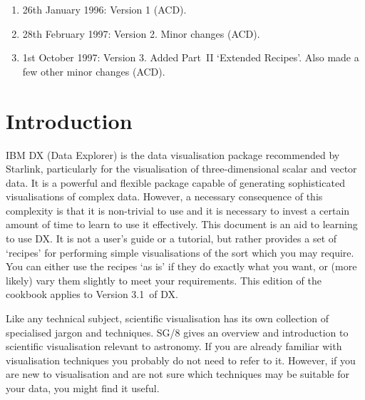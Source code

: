 \documentclass[twoside,11pt]{starlink}
\providecommand{\DXversion}{3.1~}
\begin{document}
\scfrontmatter


\begin{enumerate}

  \item 26th January 1996: Version 1 (ACD).

  \item 28th February 1997: Version 2.  Minor changes (ACD).

  \item 1st October 1997: Version 3. Added Part~II `Extended
   Recipes'.  Also made a few other minor changes (ACD).

\end{enumerate}

\cleardoublepage


\section{Introduction}

IBM DX (Data Explorer) is the data visualisation package recommended by
Starlink, particularly for the visualisation of three-dimensional
scalar and vector data. It is a powerful and flexible package capable
of generating sophisticated visualisations of complex data. However, a
necessary consequence of this complexity is that it is non-trivial to
use and it is necessary to invest a certain amount of time to learn to
use it effectively. This document is an aid to learning to use DX. It
is not a user's guide or a tutorial, but rather provides a set of
`recipes' for performing simple visualisations of the sort which
you may require. You can either use the recipes `as is' if they do
exactly what you want, or (more likely) vary them slightly to meet
your requirements. This edition of the cookbook applies to Version
\DXversion of DX.

Like any technical subject, scientific visualisation has its own
collection of specialised jargon and techniques. SG/8 \cite{SG8}
gives an overview and introduction to scientific visualisation relevant
to astronomy. If you are already familiar with visualisation techniques
you probably do not need to refer to it. However, if you are new to
visualisation and are not sure which techniques may be suitable for your
data, you might find it useful.
\end{document}
